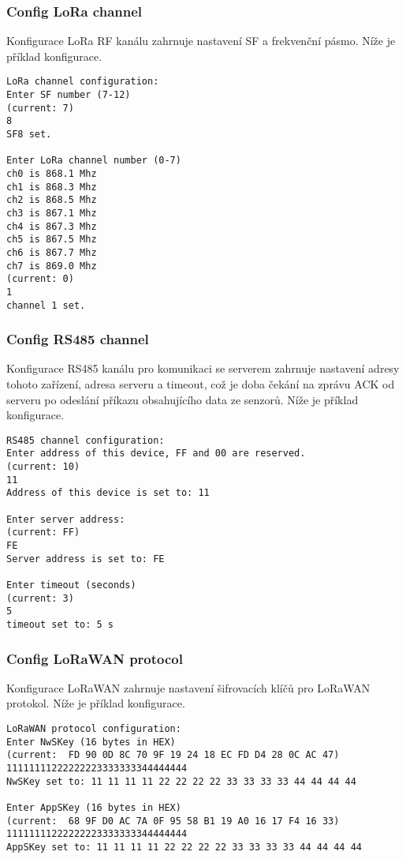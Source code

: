\subsubsection{Config LoRa channel}
Konfigurace LoRa RF kanálu zahrnuje nastavení SF a frekvenční pásmo. Níže je příklad konfigurace.

\begin{lstlisting}
LoRa channel configuration:
Enter SF number (7-12)
(current: 7)
8
SF8 set.

Enter LoRa channel number (0-7)
ch0 is 868.1 Mhz
ch1 is 868.3 Mhz
ch2 is 868.5 Mhz
ch3 is 867.1 Mhz
ch4 is 867.3 Mhz
ch5 is 867.5 Mhz
ch6 is 867.7 Mhz
ch7 is 869.0 Mhz
(current: 0)
1
channel 1 set.
\end{lstlisting}


\subsubsection{Config RS485 channel}
Konfigurace RS485 kanálu pro komunikaci se serverem zahrnuje nastavení adresy tohoto zařízení, adresa serveru a timeout, což je doba čekání na zprávu ACK od serveru po odeslání příkazu obsahujícího data ze senzorů. Níže je příklad konfigurace.

\begin{lstlisting}
RS485 channel configuration:
Enter address of this device, FF and 00 are reserved.
(current: 10)
11
Address of this device is set to: 11

Enter server address: 
(current: FF)
FE
Server address is set to: FE

Enter timeout (seconds)
(current: 3)
5
timeout set to: 5 s
\end{lstlisting}


\subsubsection{Config LoRaWAN protocol}
Konfigurace LoRaWAN zahrnuje nastavení šifrovacích klíčů pro LoRaWAN protokol. Níže je příklad konfigurace.

\begin{lstlisting}
LoRaWAN protocol configuration:
Enter NwSKey (16 bytes in HEX)
(current:  FD 90 0D 8C 70 9F 19 24 18 EC FD D4 28 0C AC 47)
11111111222222223333333344444444
NwSKey set to: 11 11 11 11 22 22 22 22 33 33 33 33 44 44 44 44

Enter AppSKey (16 bytes in HEX)
(current:  68 9F D0 AC 7A 0F 95 58 B1 19 A0 16 17 F4 16 33)
11111111222222223333333344444444
AppSKey set to: 11 11 11 11 22 22 22 22 33 33 33 33 44 44 44 44
\end{lstlisting}




